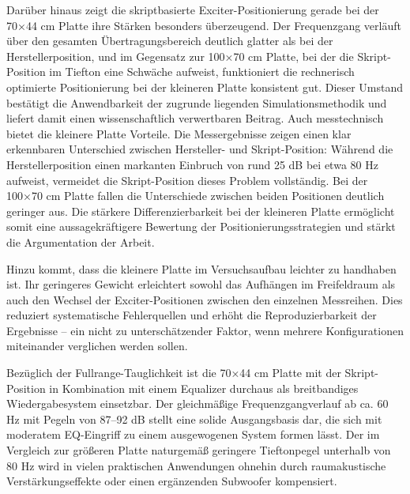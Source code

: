 Darüber hinaus zeigt die skriptbasierte Exciter-Positionierung gerade bei der 70×44 cm Platte ihre Stärken besonders überzeugend. Der Frequenzgang verläuft über den gesamten Übertragungsbereich deutlich glatter als bei der Herstellerposition, und im Gegensatz zur 100×70 cm Platte, bei der die Skript-Position im Tiefton eine Schwäche aufweist, funktioniert die rechnerisch optimierte Positionierung bei der kleineren Platte konsistent gut. Dieser Umstand bestätigt die Anwendbarkeit der zugrunde liegenden Simulationsmethodik und liefert damit einen wissenschaftlich verwertbaren Beitrag.
Auch messtechnisch bietet die kleinere Platte Vorteile. Die Messergebnisse zeigen einen klar erkennbaren Unterschied zwischen Hersteller- und Skript-Position: Während die Herstellerposition einen markanten Einbruch von rund 25 dB bei etwa 80 Hz aufweist, vermeidet die Skript-Position dieses Problem vollständig. Bei der 100×70 cm Platte fallen die Unterschiede zwischen beiden Positionen deutlich geringer aus. Die stärkere Differenzierbarkeit bei der kleineren Platte ermöglicht somit eine aussagekräftigere Bewertung der Positionierungsstrategien und stärkt die Argumentation der Arbeit.


Hinzu kommt, dass die kleinere Platte im Versuchsaufbau leichter zu handhaben ist. Ihr geringeres Gewicht erleichtert sowohl das Aufhängen im Freifeldraum als auch den Wechsel der Exciter-Positionen zwischen den einzelnen Messreihen. Dies reduziert systematische Fehlerquellen und erhöht die Reproduzierbarkeit der Ergebnisse – ein nicht zu unterschätzender Faktor, wenn mehrere Konfigurationen miteinander verglichen werden sollen.


Bezüglich der Fullrange-Tauglichkeit ist die 70×44 cm Platte mit der Skript-Position in Kombination mit einem Equalizer durchaus als breitbandiges Wiedergabesystem einsetzbar. Der gleichmäßige Frequenzgangverlauf ab ca. 60 Hz mit Pegeln von 87–92 dB stellt eine solide Ausgangsbasis dar, die sich mit moderatem EQ-Eingriff zu einem ausgewogenen System formen lässt. Der im Vergleich zur größeren Platte naturgemäß geringere Tieftonpegel unterhalb von 80 Hz wird in vielen praktischen Anwendungen ohnehin durch raumakustische Verstärkungseffekte oder einen ergänzenden Subwoofer kompensiert.


